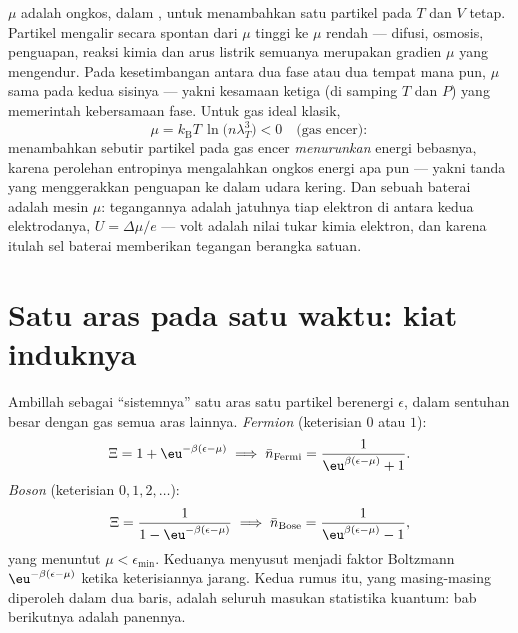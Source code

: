 \begin{definition}\label{def:b3:grand-canonical:mu}
$\mu$ adalah ongkos, dalam , untuk menambahkan satu partikel
pada $T$ dan $V$ tetap. Partikel mengalir secara spontan dari $\mu$
tinggi ke $\mu$ rendah --- difusi, osmosis, penguapan, reaksi kimia dan
arus listrik semuanya merupakan gradien $\mu$ yang mengendur. Pada
kesetimbangan antara dua fase atau dua tempat mana pun, $\mu$ sama pada
kedua sisinya --- yakni kesamaan ketiga (di samping $T$ dan $P$) yang
memerintah kebersamaan fase. Untuk gas ideal klasik,
\[
\mu = k_{\text{B}}T\,\ln\!\big(n\lambda_T^3\big) < 0
\quad\text{(gas encer)} :
\]
menambahkan sebutir partikel pada gas encer \emph{menurunkan} energi
bebasnya, karena perolehan entropinya mengalahkan ongkos energi apa pun
--- yakni tanda yang menggerakkan penguapan ke dalam udara kering. Dan
sebuah baterai adalah mesin $\mu$: tegangannya adalah jatuhnya  tiap elektron di antara kedua elektrodanya,
$U = \Delta\mu/e$ --- volt adalah nilai tukar kimia elektron, dan
karena itulah sel baterai memberikan tegangan berangka satuan.
\end{definition}

\section{Satu aras pada satu waktu: kiat induknya}

\begin{theorem}\label{thm:b3:grand-canonical:occupation}
Ambillah sebagai ``sistemnya'' satu aras satu partikel berenergi
$\epsilon$, dalam sentuhan besar dengan gas semua aras lainnya.
\emph{Fermion} (keterisian $0$ atau $1$):
\[
\Xi = 1 + \eu^{-\beta(\epsilon - \mu)}
\;\Longrightarrow\;
\bar n_{\text{Fermi}} = \frac{1}{\eu^{\beta(\epsilon - \mu)} + 1} .
\]
\emph{Boson} (keterisian $0, 1, 2, \dots$):
\[
\Xi = \frac{1}{1 - \eu^{-\beta(\epsilon - \mu)}}
\;\Longrightarrow\;
\bar n_{\text{Bose}} = \frac{1}{\eu^{\beta(\epsilon - \mu)} - 1} ,
\]
yang menuntut $\mu < \epsilon_{\min}$. Keduanya menyusut menjadi faktor
Boltzmann $\eu^{-\beta(\epsilon - \mu)}$ ketika keterisiannya jarang.
Kedua rumus itu, yang masing-masing diperoleh dalam dua baris, adalah
seluruh masukan statistika kuantum: bab berikutnya adalah panennya.
\end{theorem}

